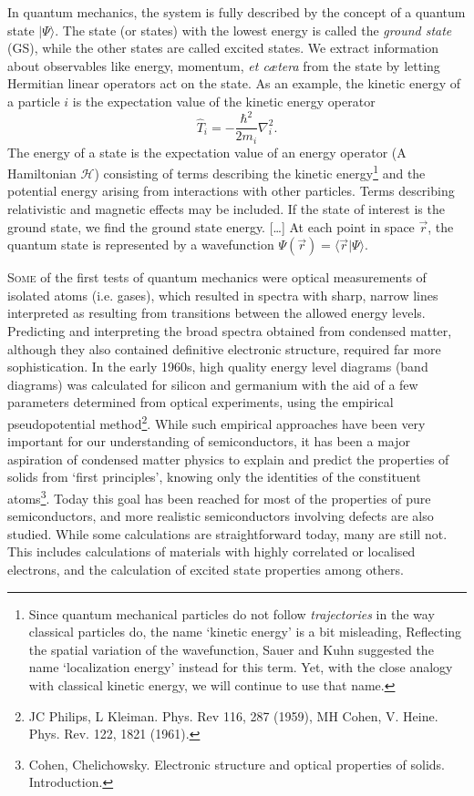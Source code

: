 \documentclass[11pt]{scrbook}   %
\begin{document}
In quantum mechanics, the system is fully
described by the concept of a quantum state $|\Psi\rangle$. The state (or
states) with the lowest energy is called the \emph{ground state} (GS), 
while the other states are called excited states. We extract information about 
observables like energy, momentum, \textit{et cætera} from the state by 
letting Hermitian linear operators act on the state. As an example, the 
kinetic energy of a particle $i$ is the expectation value of the kinetic 
energy operator
\begin{equation}
  \hat{T}_i = -\frac{\hbar^2}{2m_i}\nabla_i^2.
  \label{eq:kineticenergy}
\end{equation}
The energy of a state is the expectation value of an energy operator (A
Hamiltonian $\mathcal{H}$) consisting of terms describing the kinetic 
energy\footnote{Since quantum mechanical particles do not follow \emph{trajectories} 
in the way classical particles do, the name `kinetic energy' is 
a bit misleading, Reflecting the spatial variation of the wavefunction, Sauer and Kuhn suggested the 
name `localization energy' instead for this term\cite{Sauer:1982}.
Yet, with the close analogy with classical kinetic energy, we will continue to use that name.
}
and the potential energy arising from interactions with other particles.
Terms describing relativistic and magnetic effects may be included.
If the state of interest is the ground state, we find the ground state energy.
[\dots] At each point in space $\vec{r}$, the quantum state is represented by a 
wavefunction $\Psi(\vec{r})=\langle\vec{r}|\Psi\rangle$.



\lettrine[lines=3,slope=0pt,nindent=0pt]{S}{ome}
of the first tests of quantum mechanics were optical measurements of
isolated atoms (i.e. gases), which resulted in spectra with sharp, narrow 
lines interpreted as resulting from transitions between the allowed energy 
levels. Predicting and interpreting the broad spectra obtained from condensed 
matter, although they also contained definitive electronic structure, required 
far more sophistication. In the early 1960s, high quality energy level diagrams 
(band diagrams) was calculated for silicon and germanium with the aid of a few
parameters determined from optical experiments, using the empirical
pseudopotential method\footnote{JC Philips, L Kleiman. Phys. Rev 116, 287
(1959), MH Cohen, V. Heine. Phys. Rev. 122, 1821 (1961).}. While such
empirical approaches have been very important for our understanding of
semiconductors, it has been a major aspiration of condensed matter
physics to explain and predict the properties of solids from `first
principles', knowing only the identities of the constituent
atoms\footnote{Cohen, Chelichowsky. Electronic structure and optical
properties of solids. Introduction.}. Today this goal has been reached for
most of the properties of pure semiconductors, and more realistic
semiconductors involving defects are also studied. While some calculations
are straightforward today, many are still not. This includes calculations of
materials with highly correlated or localised electrons, and the calculation
of excited state properties among others.
\end{document}
